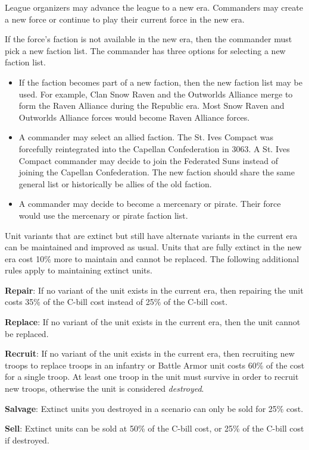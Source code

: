 League organizers may advance the league to a new era.
Commanders may create a new force or continue to play their current force in the new era.

If the force's faction is not available in the new era, then the commander must pick a new faction list.
The commander has three options for selecting a new faction list.

\begin{itemize}

\item If the faction becomes part of a new faction, then the new faction list may be used.
For example, Clan Snow Raven and the Outworlds Alliance merge to form the Raven Alliance during the Republic era.
Most Snow Raven and Outworlds Alliance forces would become Raven Alliance forces.

\item A commander may select an allied faction.
The St. Ives Compact was forcefully reintegrated into the Capellan Confederation in 3063.
A St. Ives Compact commander may decide to join the Federated Suns instead of joining the Capellan Confederation.
The new faction should share the same general list or historically be allies of the old faction.

\item A commander may decide to become a mercenary or pirate.
Their force would use the mercenary or pirate faction list.

\end{itemize}

Unit variants that are extinct but still have alternate variants in the current era can be maintained and improved as usual.
Units that are fully extinct in the new era cost 10\% more to maintain and cannot be replaced.
The following additional rules apply to maintaining extinct units.

\begin{description}

\item {\bfseries Repair}: If no variant of the unit exists in the current era, then repairing the unit costs 35\% of the C-bill cost instead of 25\% of the C-bill cost.

\item {\bfseries Replace}: If no variant of the unit exists in the current era, then the unit cannot be replaced.

\item {\bfseries Recruit}: If no variant of the unit exists in the current era, then recruiting new troops to replace troops in an infantry or Battle Armor unit costs 60\% of the cost for a single troop.
At least one troop in the unit must survive in order to recruit new troops, otherwise the unit is considered \emph{destroyed}.

\item {\bfseries Salvage}: Extinct units you destroyed in a scenario can only be sold for 25\% cost.

\item {\bfseries Sell}: Extinct units can be sold at 50\% of the C-bill cost, or 25\% of the C-bill cost if destroyed.

\end{description}
